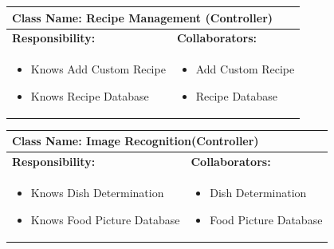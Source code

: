 \documentclass[]{article}
\begin{document}
\begin{table}[H]
	\centering
	\begin{tabular}{|p{7cm}|p{7cm}|}
	\hline 
	 \multicolumn{2}{|l|}{\textbf{Class Name:} Recipe Management (Controller) }\\
	\hline
	\textbf{Responsibility:} & \textbf{Collaborators:} \\
	\hline
	\raggedright
	\begin{itemize}
		\item Knows Add Custom Recipe
		\item Knows Recipe Database
	\end{itemize}
	\vspace{1in} & 
	\begin{itemize}
		\item Add Custom Recipe 
		\item Recipe Database
	\end{itemize} \\
	\hline
	\end{tabular}
\end{table}

\begin{table}[H]
	\centering
	\begin{tabular}{|p{7cm}|p{7cm}|}
	\hline 
	 \multicolumn{2}{|l|}{\textbf{Class Name:} Image Recognition(Controller) }\\
	\hline
	\textbf{Responsibility:} & \textbf{Collaborators:} \\
	\hline
	\raggedright
	\begin{itemize}
		\item Knows Dish Determination
		\item Knows Food Picture Database
	\end{itemize}
	\vspace{1in} & 
	\begin{itemize}
		\item Dish Determination 
		\item Food Picture Database
	\end{itemize} \\
	\hline
	\end{tabular}
\end{table}
\end{document}
